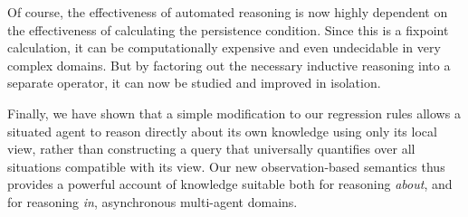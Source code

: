 Of course, the effectiveness of automated reasoning is now highly
dependent on the effectiveness of calculating the persistence condition.
Since this is a fixpoint calculation, it can be computationally expensive
and even undecidable in very complex domains. But by factoring out
the necessary inductive reasoning into a separate operator, it can
now be studied and improved in isolation.

Finally, we have shown that a simple modification to our regression
rules allows a situated agent to reason directly about its own knowledge
using only its local view, rather than constructing a query that universally
quantifies over all situations compatible with its view. Our new observation-based
semantics thus provides a powerful account of knowledge suitable both
for reasoning \emph{about}, and for reasoning \emph{in}, asynchronous
multi-agent domains.

